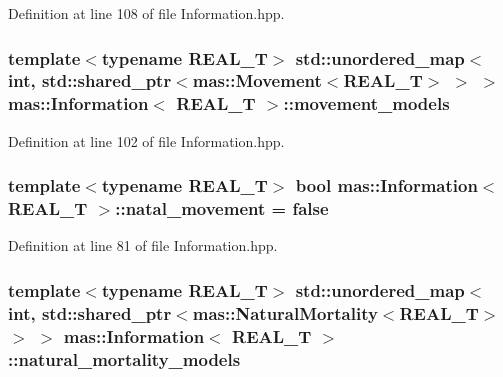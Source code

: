 Definition at line 108 of file Information.\-hpp.

\hypertarget{classmas_1_1_information_a0e3fd8c389a107440c7e5e57fe933527}{
\subsubsection[{movement\-\_\-models}]{\setlength{\rightskip}{0pt plus 5cm}template$<$typename R\-E\-A\-L\-\_\-\-T$>$ std\-::unordered\-\_\-map$<$int, std\-::shared\-\_\-ptr$<${\bf mas\-::\-Movement}$<$R\-E\-A\-L\-\_\-\-T$>$ $>$ $>$ {\bf mas\-::\-Information}$<$ R\-E\-A\-L\-\_\-\-T $>$\-::movement\-\_\-models}}\label{classmas_1_1_information_a0e3fd8c389a107440c7e5e57fe933527}


Definition at line 102 of file Information.\-hpp.

\hypertarget{classmas_1_1_information_abfd53a611fac22190c00882c84b8c39d}{
\subsubsection[{natal\-\_\-movement}]{\setlength{\rightskip}{0pt plus 5cm}template$<$typename R\-E\-A\-L\-\_\-\-T$>$ bool {\bf mas\-::\-Information}$<$ R\-E\-A\-L\-\_\-\-T $>$\-::natal\-\_\-movement = false}}\label{classmas_1_1_information_abfd53a611fac22190c00882c84b8c39d}


Definition at line 81 of file Information.\-hpp.

\hypertarget{classmas_1_1_information_acf9c6846c98a230ec902d85e3ee3b5c8}{
\subsubsection[{natural\-\_\-mortality\-\_\-models}]{\setlength{\rightskip}{0pt plus 5cm}template$<$typename R\-E\-A\-L\-\_\-\-T$>$ std\-::unordered\-\_\-map$<$int, std\-::shared\-\_\-ptr$<${\bf mas\-::\-Natural\-Mortality}$<$R\-E\-A\-L\-\_\-\-T$>$ $>$ $>$ {\bf mas\-::\-Information}$<$ R\-E\-A\-L\-\_\-\-T $>$\-::natural\-\_\-mortality\-\_\-models}}\label{classmas_1_1_information_acf9c6846c98a230ec902d85e3ee3b5c8}


